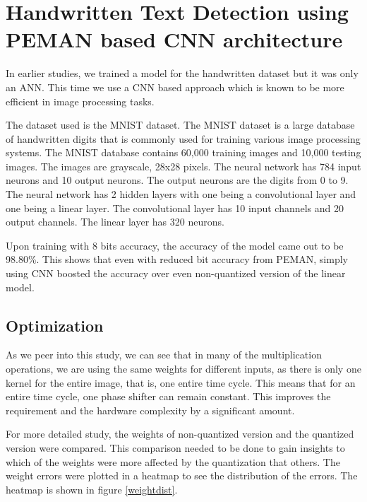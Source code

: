 \chapter{Handwritten Text Detection using PEMAN based CNN architecture}

In earlier studies, we trained a model for the handwritten dataset but it was only an ANN. This time we use a CNN based approach which is known to be more efficient in image processing tasks.

The dataset used is the MNIST dataset. The MNIST dataset is a large database of handwritten digits that is commonly used for training various image processing systems. The MNIST database contains 60,000 training images and 10,000 testing images. The images are grayscale, 28x28 pixels. The neural network has 784 input neurons and 10 output neurons. The output neurons are the digits from 0 to 9. The neural network has 2 hidden layers with one being a convolutional layer and one being a linear layer. The convolutional layer has 10 input channels and 20 output channels. The linear layer has 320 neurons.

Upon training with 8 bits accuracy, the accuracy of the model came out to be 98.80\%. This shows that even with reduced bit accuracy from PEMAN, simply using CNN boosted the accuracy over even non-quantized version of the linear model. 

\section{Optimization}

As we peer into this study, we can see that in many of the multiplication operations, we are using the same weights for different inputs, as there is only one kernel for the entire image, that is, one entire time cycle. This means that for an entire time cycle, one phase shifter can remain constant. This improves the requirement and the hardware complexity by a significant amount.

For more detailed study, the weights of non-quantized version and the quantized version were compared. This comparison needed to be done to gain insights to which of the weights were more affected by the quantization that others. The weight errors were plotted in a heatmap to see the distribution of the errors. The heatmap is shown in figure \ref{weightdist}.

